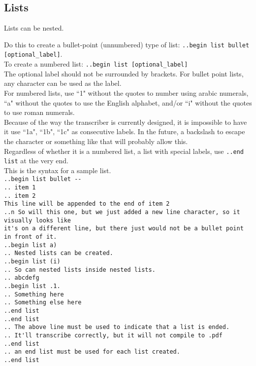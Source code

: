\documentclass[12pt]{article}
\newcommand{\nl}{\\}
\numberwithin{equation}{section}
\begin{document}
\begin{flushleft}
\section{Lists}

Lists can be nested.

Do this to create a bullet-point (unnumbered) type of list: \verb|..begin list bullet [optional_label]|.\nl
To create a numbered list: \verb|..begin list [optional_label]|\nl
The optional label should not be surrounded by brackets. For bullet point lists, any character can be used as the label. \nl
For numbered lists, use ``1" without the quotes to number using arabic numerals, ``a" without the quotes to use the English alphabet, and/or ``i" without the quotes to use roman numerals. \nl
Because of the way the transcriber is currently designed, it is impossible to have it use ``1a", ``1b", ``1c" as consecutive labels. In the future, a backslash to escape the character or something like that will probably allow this. \nl
Regardless of whether it is a numbered list, a list with special labels, use \verb|..end list| at the very end. \nl
\bigskip
This is the syntax for a sample list. \nl
\verb|..begin list bullet --|\nl
\verb|.. item 1|\nl
\verb|.. item 2|\nl
\verb|This line will be appended to the end of item 2|\nl
\verb|..n So will this one, but we just added a new line character, so it visually looks like|\nl
\verb|it's on a different line, but there just would not be a bullet point in front of it.|\nl
\verb|..begin list a)|\nl
\verb|.. Nested lists can be created.|\nl
\verb|..begin list (i)|\nl
\verb|.. So can nested lists inside nested lists.|\nl
\verb|.. abcdefg|\nl
\verb|..begin list .1.|\nl
\verb|.. Something here|\nl
\verb|.. Something else here|\nl
\verb|..end list|\nl
\verb|..end list|\nl
\verb|.. The above line must be used to indicate that a list is ended.|\nl
\verb|.. It'll transcribe correctly, but it will not compile to .pdf|\nl
\verb|..end list|\nl
\verb|.. an end list must be used for each list created.|\nl
\verb|..end list|\nl
\bigskip


\end{flushleft}
\end{document}
